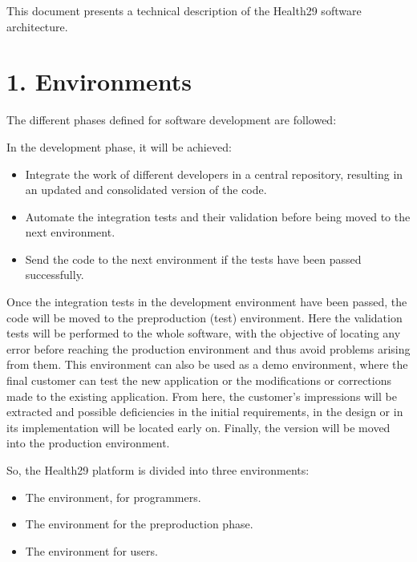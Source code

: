 \documentclass[letterpaper,10pt,english]{sphinxmanual}
\begin{document}
This document presents a technical description of the Health29 software architecture.




\chapter{1. Environments}
\label{\detokenize{pages/Environments:environments}}\label{\detokenize{pages/Environments::doc}}
The different phases defined for software development are followed:



In the development phase, it will be achieved:
\begin{itemize}
\item {} 
Integrate the work of different developers in a central repository, resulting in an updated and consolidated version of the code.

\item {} 
Automate the integration tests and their validation before being moved to the next environment.

\item {} 
Send the code to the next environment if the tests have been passed successfully.

\end{itemize}

Once the integration tests in the development environment have been passed, the code will be moved to the pre\sphinxhyphen{}production (test) environment. Here the validation tests will be performed to the whole software, with the objective of locating any error before reaching the production environment and thus avoid problems arising from them. This environment can also be used as a demo environment, where the final customer can test the new application or the modifications or corrections made to the existing application. From here, the customer’s impressions will be extracted and possible deficiencies in the initial requirements, in the design or in its implementation will be located early on.
Finally, the version will be moved into the production environment.

So, the Health29 platform is divided into three environments:
\begin{itemize}
\item {} 
The  environment, for programmers.

\item {} 
The  environment for the pre\sphinxhyphen{}production phase.

\item {} 
The  environment for users.

\end{itemize}
\end{document}
